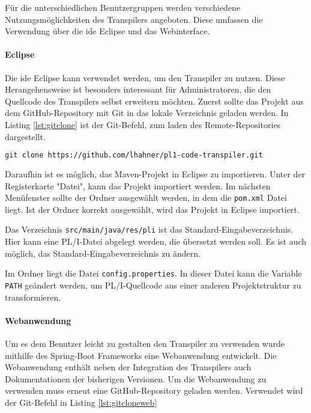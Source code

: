 Für die unterschiedlichen Benutzergruppen werden verschiedene Nutzungsmöglichkeiten des Transpilers angeboten. Diese umfassen die Verwendung über die \ac{ide} Eclipse und das Webinterface.

\paragraph{Eclipse}
Die \ac{ide} Eclipse kann verwendet werden, um den Transpiler zu nutzen. Diese Herangehensweise ist besonders interessant für Administratoren, die den Quellcode des Transpilers selbst erweitern möchten.
Zuerst sollte das Projekt aus dem GitHub-Repository mit Git in das lokale Verzeichnis geladen werden.
In Listing \ref{lst:gitclone} ist der Git-Befehl, zum laden des Remote-Repositories dargestellt. 

\begin{lstlisting}[language=bash, caption=Klonen des Transpiler Repositories, label={lst:gitclone}]
git clone https://github.com/lhahner/pl1-code-transpiler.git
\end{lstlisting}

Daraufhin ist es möglich, das Maven-Projekt in Eclipse zu importieren. Unter der Registerkarte "Datei", kann das Projekt importiert werden. Im nächsten Menüfenster sollte der Ordner ausgewählt werden, in dem die \verb+pom.xml+ Datei liegt. Ist der Ordner korrekt ausgewählt, wird das Projekt in Eclipse importiert. 

Das Verzeichnis \verb+src/main/java/res/pli+ ist das Standard-Eingabeverzeichnis. Hier kann eine PL/I-Datei abgelegt werden, die übersetzt werden soll. Es ist auch möglich, das Standard-Eingabeverzeichnis zu ändern. 

Im Ordner  liegt die Datei \verb+config.properties+. 
In dieser Datei kann die Variable \verb+PATH+ geändert werden, 
um PL/I-Quellcode aus einer anderen Projektstruktur zu transformieren.
\pagebreak
\paragraph{Webanwendung}
Um es dem Benutzer leicht zu gestalten den Transpiler zu verwenden wurde mithilfe des Spring-Boot Frameworks eine Webanwendung entwickelt.
Die Webanwendung enthält neben der Integration des Transpilers auch Dokumentationen der bisherigen Versionen.
Um die Webanwendung zu verwenden muss erneut eine GitHub-Repository geladen werden. Verwendet wird der Git-Befehl in Listing
\ref{lst:gitcloneweb}

